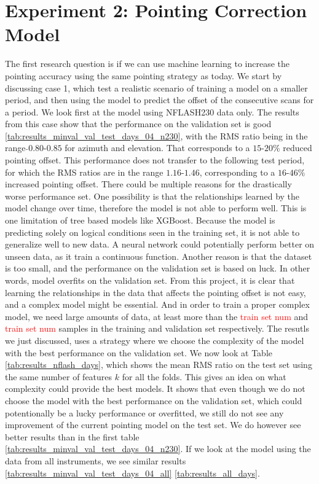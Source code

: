 \section{Experiment 2: Pointing Correction Model}
The first research question is if we can use machine learning to increase the pointing accuracy using the same pointing strategy as today.
We start by discussing case 1, which test a realistic scenario of training a model on a smaller period,
and then using the model to predict the offset of the consecutive scans for a period.
We look first at the model using NFLASH230 data only.
The results from this case show that the performance on the validation set is good \ref{tab:results_minval_val_test_days_04_n230},
with the RMS ratio being in the range $\tilde{}0.80$-$0.85$ for azimuth and elevation.
That corresponds to a $15$-$20\%$ reduced pointing offset.
This performance does not transfer to the following test period,
for which the RMS ratios are in the range $1.16$-$1.46$, corresponding to a $16$-$46\%$ increased pointing offset.
There could be multiple reasons for the drastically worse performance set.
One possibility is that the relationships learned by the model change over time, therefore the model is not able to perform well.
This is one limitation of tree based models like XGBoost.
Because the model is predicting solely on logical conditions seen in the training set,
it is not able to generalize well to new data.
A neural network could potentially perform better on unseen data, as it train a continuous function.
Another reason is that the dataset is too small, and the performance on the validation set is based on luck.
In other words, model overfits on the validation set.
From this project, it is clear that learning the relationships in the data that affects the pointing offset is not easy, and a complex model might be essential.
And in order to train a proper complex model, we need large amounts of data,
at least more than the \textcolor{red}{train set num} and \textcolor{red}{train set num} samples in the training and validation set respectively.
The resutls we just discussed, uses a strategy where we choose the complexity of the model with the best performance on the validation set.
We now look at Table \ref{tab:results_nflash_days}, which shows the mean RMS ratio on the test set using the same number of features $k$ for all the folds.
This gives an idea on what complexity could provide the best models.
It shows that even though we do not choose the model with the best performance on the validation set, which could potentionally be a lucky performance or overfitted,
we still do not see any improvement of the current pointing model on the test set.
We do however see better results than in the first table \ref{tab:results_minval_val_test_days_04_n230}.
If we look at the model using the data from all instruments, we see similar results \ref{tab:results_minval_val_test_days_04_all} \ref{tab:results_all_days}.\\

